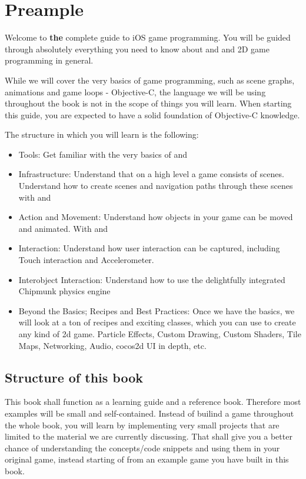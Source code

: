 \chapter{Preample}
Welcome to \textbf{the} complete guide to iOS game programming.
You will be guided through absolutely everything you need to know about
\cocos{} and \spriteb{} and 2D game programming in general.

While we will cover the very basics of game programming, such as scene graphs,
animations and game loops - Objective-C, the language we will be using
throughout the book is not in the scope of things you will learn. When starting
this guide, you are expected to have a solid foundation of Objective-C
knowledge.

The structure in which you will learn is the following:
\begin{itemize}
  \item Tools: Get familiar with the very basics of \cocos{} and \spriteb{}
  \item Infrastructure: Understand that on a high level a game consists of
  scenes. Understand how to create scenes and navigation paths through these
  scenes with \cocos{} and \spriteb{}
  \item Action and Movement: Understand how objects in your game can be moved
  and animated. With \cocos{} and \spriteb{}
  \item Interaction: Understand how user interaction can be captured, including
  Touch interaction and Accelerometer.
  \item Interobject Interaction: Understand how to use the delightfully
  integrated Chipmunk physics engine
  \item Beyond the Basics; Recipes and Best Practices:  Once we have the basics,
  we will look at a ton of recipes and exciting \cocos{} classes, which you can
  use to create any kind of 2d game. Particle Effects, Custom Drawing, Custom
  Shaders, Tile Maps, Networking, Audio, cocos2d UI in depth, etc.
\end{itemize}

\section{Structure of this book}
This book shall function as a learning guide and a reference book. Therefore
most examples will be small and self-contained. Instead of builind a game
throughout the whole book, you will learn by implementing very small projects
that are limited to the material we are currently discussing. 
That shall give you a better chance of understanding the concepts/code
snippets and using them in your original game, instead starting of from an
example game you have built in this book.

